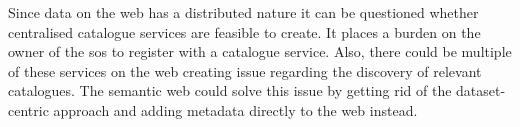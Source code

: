 Since data on the web has a distributed nature it can be questioned whether centralised catalogue services are feasible to create. It places a burden on the owner of the \ac{sos} to register with a catalogue service. Also, there could be multiple of these services on the web creating issue regarding the discovery of relevant catalogues. The semantic web could solve this issue by getting rid of the dataset-centric approach and adding metadata directly to the web instead.



